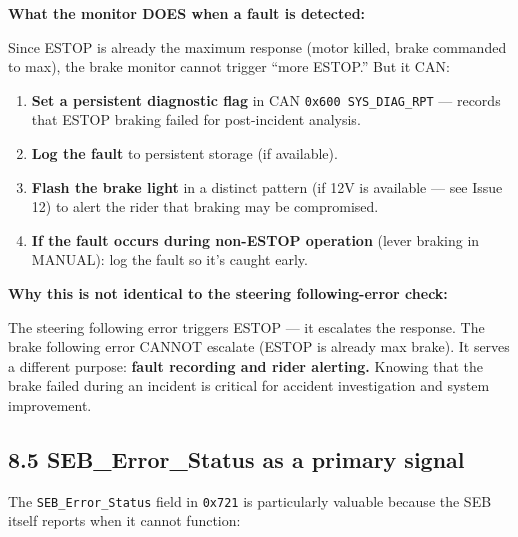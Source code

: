 \documentclass[12pt,a4paper,oneside]{report}
\providecommand{\tightlist}{\setlength{\itemsep}{0pt}\setlength{\parskip}{0pt}}
\begin{document}
\textbf{What the monitor DOES when a fault is detected:}

Since ESTOP is already the maximum response (motor killed, brake commanded to
max), the brake monitor cannot trigger ``more ESTOP.'' But it CAN:

\begin{enumerate}
\def\labelenumi{\arabic{enumi}.}
\tightlist
\item
  \textbf{Set a persistent diagnostic flag} in CAN
  \texttt{0x600\ SYS\_DIAG\_RPT} --- records that ESTOP braking failed for
  post-incident analysis.
\item
  \textbf{Log the fault} to persistent storage (if available).
\item
  \textbf{Flash the brake light} in a distinct pattern (if 12V is available ---
  see Issue 12) to alert the rider that braking may be compromised.
\item
  \textbf{If the fault occurs during non-ESTOP operation} (lever braking in
  MANUAL): log the fault so it's caught early.
\end{enumerate}

\textbf{Why this is not identical to the steering following-error check:}

The steering following error triggers ESTOP --- it escalates the response. The
brake following error CANNOT escalate (ESTOP is already max brake). It serves a
different purpose: \textbf{fault recording and rider alerting.} Knowing that the
brake failed during an incident is critical for accident investigation and
system improvement.

\subsection{8.5 SEB\_Error\_Status as a primary
signal}\label{seb_error_status-as-a-primary-signal}

The \texttt{SEB\_Error\_Status} field in \texttt{0x721} is particularly valuable
because the SEB itself reports when it cannot function:
\end{document}
